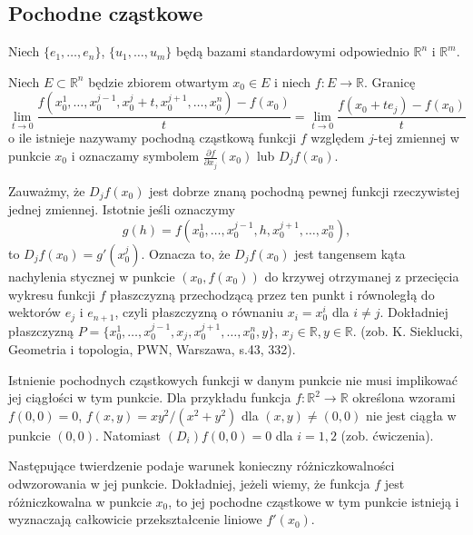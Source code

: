 \documentclass[leqno]{article}
\begin{document}
\begin{justify}
\subsection{Pochodne cząstkowe}

Niech $\{e_1, \ldots, e_n\}$, $\{u_1, \ldots, u_m\}$ będą bazami standardowymi odpowiednio $\mathbb{R}^n$ i $\mathbb{R}^m$.

\begin{defn}
    Niech $E \subset \mathbb{R}^n$ będzie zbiorem otwartym $x_0 \in E$ i niech $f : E \to \mathbb{R}$.
    Granicę
    \[
        \lim\limits_{t \to 0}\frac{f(x_0^1, \ldots, x_0^{j - 1}, x_0^j + t, x_0^{j+1}, \ldots, x_0^n) - f(x_0)}{t} = \lim\limits_{t \to 0}\frac{f(x_0 + te_j) - f(x_0)}{t}    
    \]
    o ile istnieje nazywamy pochodną cząstkową funkcji $f$ względem $j$-tej zmiennej w punkcie $x_0$ i oznaczamy symbolem $\frac{\partial f}{\partial x_j}(x_0)$ lub $D_j f(x_0)$.

\end{defn}

\begin{uwaga}
    Zauważmy, że $D_j f(x_0)$ jest dobrze znaną pochodną pewnej funkcji rzeczywistej jednej zmiennej. Istotnie jeśli oznaczymy
    \[
        g(h) = f(x_0^1, \ldots, x_0^{j-1}, h, x_0^{j+1}, \ldots, x_0^n),
    \]
    to $D_j f(x_0) = g'(x_0^j)$. Oznacza to, że $D_j f(x_0)$ jest tangensem kąta nachylenia stycznej w punkcie $(x_0, f(x_0))$
    do krzywej otrzymanej z przecięcia wykresu funkcji $f$ płaszczyzną przechodzącą przez ten punkt i równoległą do wektorów $e_j$ i $e_{n+1}$,
    czyli płaszczyzną o równaniu $x_i = x_0^i$ dla $i \neq j$. Dokładniej płaszczyzną $P = \{x_0^1, \ldots, x_0^{j-1}, x_j, x_0^{j+1}, \ldots, x_0^n, y\}$,
    $x_j \in \mathbb{R}, y \in \mathbb{R}$. (zob. K. Sieklucki, Geometria i topologia, PWN, Warszawa, s.43, 332).
\end{uwaga}

\begin{uwaga}
    Istnienie pochodnych cząstkowych funkcji w danym punkcie nie musi implikować jej ciągłości w tym punkcie. Dla przykładu funkcja $f : \mathbb{R}^2 \to \mathbb{R}$
    określona wzorami $f(0,0) = 0$, $f(x,y) = xy^2 / (x^2 + y^2)$ dla $(x, y) \neq (0, 0)$ nie jest ciągła w punkcie $(0, 0)$. Natomiast $(D_i)f(0, 0) = 0$ 
    dla $i = 1,2$ (zob. ćwiczenia).
\end{uwaga}

Następujące twierdzenie podaje warunek konieczny różniczkowalności odwzorowania w jej punkcie. Dokładniej,
jeżeli wiemy, że funkcja $f$ jest różniczkowalna w punkcie $x_0$, to jej pochodne cząstkowe w tym punkcie istnieją i wyznaczają całkowicie przekształcenie liniowe $f'(x_0)$.


\end{justify}
\end{document}
